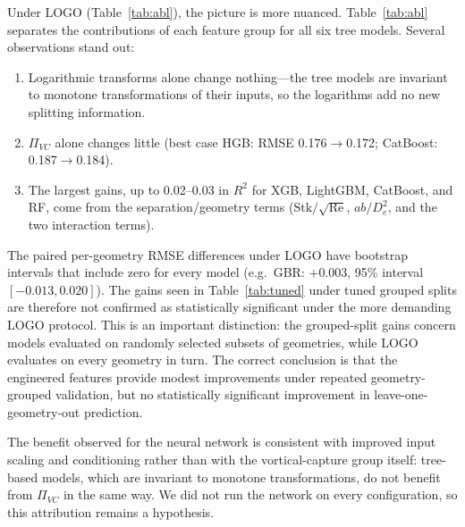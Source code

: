 \documentclass[12pt]{article}
\newcommand{\Stk}{\mathrm{Stk}}
\newcommand{\Rey}{\mathrm{Re}}
\newcommand{\PiVC}{\Pi_{VC}}
\begin{document}
\begin{table}[!ht]\centering\caption{Tuned protocol (10 grouped splits): raw versus 17 features. $\Delta$RMSE is (17 features)$-$(raw); negative is better.}\label{tab:tuned}\end{table}

Under LOGO (Table~\ref{tab:abl}), the picture is more nuanced. Table~\ref{tab:abl} separates the contributions of each feature group for all six tree models. Several observations stand out:
\begin{enumerate}[noitemsep]
\item Logarithmic transforms alone change nothing---the tree models are invariant to monotone transformations of their inputs, so the logarithms add no new splitting information.
\item $\PiVC$ alone changes little (best case HGB: RMSE 0.176$\to$0.172; CatBoost: 0.187$\to$0.184).
\item The largest gains, up to 0.02--0.03 in $R^2$ for XGB, LightGBM, CatBoost, and RF, come from the separation/geometry terms ($\Stk/\sqrt{\Rey}$, $ab/D_e^2$, and the two interaction terms).
\end{enumerate}

\begin{table}[!ht]\centering\caption{LOGO ablation by feature configuration: pooled $R^2$ / pooled RMSE (fixed hyperparameters, constants fitted within folds).}\label{tab:abl}\end{table}

The paired per-geometry RMSE differences under LOGO have bootstrap intervals that include zero for every model (e.g.\ GBR: $+0.003$, 95\% interval $[-0.013, 0.020]$). The gains seen in Table~\ref{tab:tuned} under tuned grouped splits are therefore not confirmed as statistically significant under the more demanding LOGO protocol. This is an important distinction: the grouped-split gains concern models evaluated on randomly selected subsets of geometries, while LOGO evaluates on every geometry in turn. The correct conclusion is that the engineered features provide modest improvements under repeated geometry-grouped validation, but no statistically significant improvement in leave-one-geometry-out prediction.

The benefit observed for the neural network is consistent with improved input scaling and conditioning rather than with the vortical-capture group itself: tree-based models, which are invariant to monotone transformations, do not benefit from $\PiVC$ in the same way. We did not run the network on every configuration, so this attribution remains a hypothesis.
\end{document}
